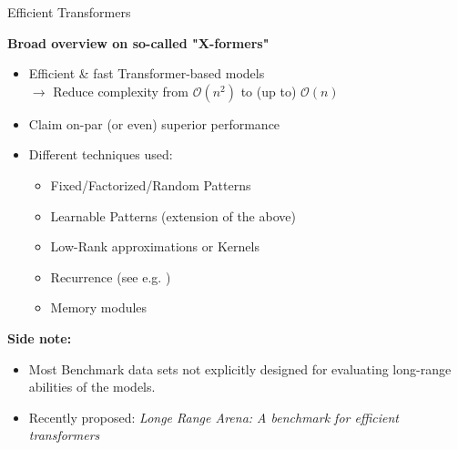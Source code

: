\begin{frame}{Efficient Transformers}

\vfill

\textbf{Broad overview on so-called "X-formers"} 

\begin{itemize}
	\item Efficient \& fast Transformer-based models\\
				$\rightarrow$ Reduce complexity from $\mathcal{O}(n^2)$ to (up to) $\mathcal{O}(n)$
	\item Claim on-par (or even) superior performance
	\item Different techniques used:
				\begin{itemize}
					\item Fixed/Factorized/Random Patterns
					\item Learnable Patterns (extension of the above)
					\item Low-Rank approximations or Kernels
					\item Recurrence (see e.g. )
					\item Memory modules
				\end{itemize}
\end{itemize}
	
	\vspace{.3cm}
	
\textbf{Side note:}

\begin{itemize}
	\item Most Benchmark data sets not explicitly designed for evaluating long-range abilities of the models.
	\item Recently proposed: \textit{Longe Range Arena: A benchmark for efficient transformers} 
\end{itemize}
	
\vfill

\end{frame}


